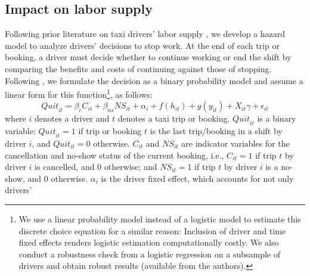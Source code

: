 \documentclass[reviewmode]{restat}
\begin{document}
\subsection{Impact on labor supply}
Following prior literature on taxi drivers' labor supply \citep{farber2005tomorrow,farber2015you,agarwal2015singaporean,chen2015dynamic}, we develop a hazard model 
to analyze drivers' decisions to stop work. At the end of each trip or booking, a driver must decide whether
to continue working or end the shift by comparing the benefits and costs of continuing against those of stopping. 
Following \citet{farber2005tomorrow,farber2015you}, we  
formulate the decision as a  binary probability model 
and assume a linear form for this function\footnote{We %
 use a linear probability model instead of a logistic model to estimate this discrete choice equation
 for a similar reason: Inclusion of driver and time fixed effects renders logistic estimation computationally
 costly. We also conduct a robustness check from a logistic regression on a subsample of drivers 
 and obtain robust results (available from the authors).}, as follows:
\begin{equation}
\label{eq:quit}
{Quit}_{it} = \beta_{c}C_{it} + \beta_{ns} {NS}_{it} + \alpha_i +  f(h_{it}) + g(y_{it}) + X_{it}\gamma  +  \epsilon_{it}
\end{equation}
where $i$ denotes a driver and $t$ denotes a taxi trip or booking. ${Quit}_{it}$ is a binary
variable: ${Quit}_{it} = 1$ if trip or booking $t$ is the last trip/booking in a shift by driver $i$,
and $Quit_{it} = 0$ otherwise. $C_{it}$ and ${NS}_{it}$ are indicator variables for
the cancellation and no-show status of the current booking, i.e., $C_{it}=1$ if trip $t$ 
by driver $i$ is cancelled, and $0$ otherwise; and ${NS}_{it}=1$ if trip $t$ by driver $i$ is a 
no-show, and $0$ otherwise. $\alpha_i$ is the driver fixed effect, which accounts for not only drivers' 
\end{document}
